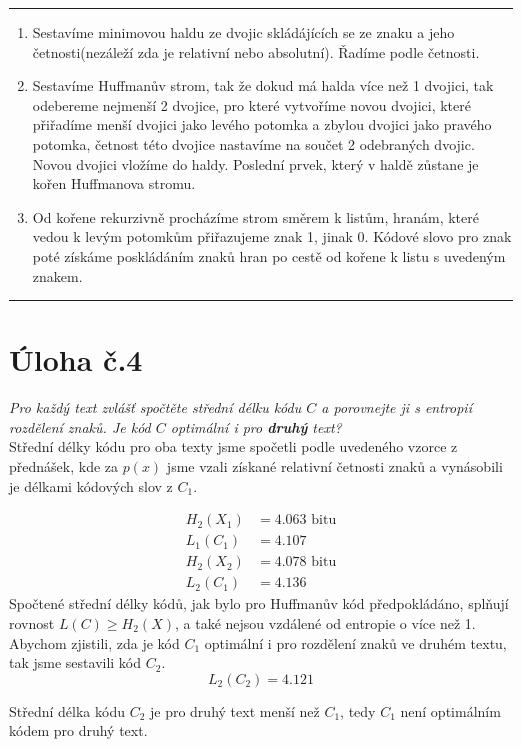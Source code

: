 \documentclass[czech]{mvi-report}
\begin{document}
\noindent\rule{\columnwidth}{1pt}
\begin{enumerate}
  \item Sestavíme minimovou haldu ze dvojic skládájících se ze znaku a jeho četnosti(nezáleží zda je relativní nebo absolutní). Řadíme podle četnosti.
  \item Sestavíme Huffmanův strom, tak že dokud má halda více než 1 dvojici, tak odebereme nejmenší 2 dvojice, pro které vytvoříme novou dvojici, které přiřadíme menší dvojici jako levého potomka a zbylou dvojici jako pravého potomka, četnost této dvojice nastavíme na součet 2 odebraných dvojic. Novou dvojici vložíme do haldy. Poslední prvek, který v haldě zůstane je kořen Huffmanova stromu.
  \item Od kořene rekurzivně procházíme strom směrem k listům, hranám, které vedou k levým potomkům přiřazujeme znak 1, jinak 0. Kódové slovo pro znak poté získáme poskládáním znaků hran po cestě od kořene k listu s uvedeným znakem.
\end{enumerate}
\noindent\rule{\columnwidth}{1pt}


\section{Úloha č.4}
\textit{Pro každý text zvlášť spočtěte střední délku kódu $C$ a porovnejte ji s entropií rozdělení znaků. Je kód $C$ optimální i pro \textbf{druhý} text?}\\

Střední délky kódu pro oba texty jsme spočetli podle uvedeného vzorce z přednášek, kde za $p(x)$ jsme vzali získané relativní četnosti znaků a vynásobili je délkami kódových slov z $C_1$.

\begin{align*}
  H_2(X_1) &= 4.063 \text{ bitu}\\
  L_1(C_1) &= 4.107\\
  H_2(X_2) &= 4.078 \text{ bitu}\\
  L_2(C_1) &= 4.136
\end{align*}
Spočtené střední délky kódů, jak bylo pro Huffmanův kód předpokládáno, splňují rovnost $L(C) \geq H_2(X)$, a také nejsou vzdálené od entropie o více než 1.
Abychom zjistili, zda je kód $C_1$ optimální i pro rozdělení znaků ve druhém textu, tak jsme sestavili kód $C_2$.
\begin{equation*}
  L_2(C_2) = 4.121
\end{equation*}

Střední délka kódu $C_2$ je pro druhý text menší než $C_1$, tedy $C_1$ není optimálním kódem pro druhý text.
\end{document}

